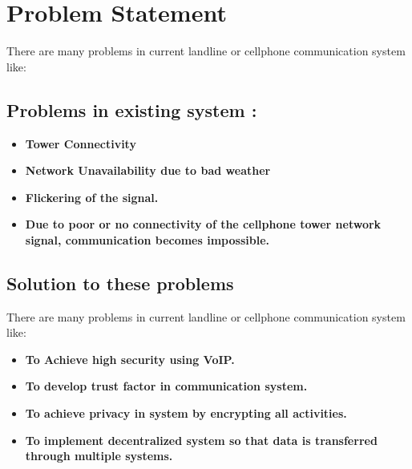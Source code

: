 \chapter{Problem Statement}
\justify
\quad 
There are many problems in current landline or cellphone communication system like:

\section{Problems in existing system : }
\begin{itemize}
    \item \textbf {Tower Connectivity}
\item \textbf {Network Unavailability due to bad weather}
\item \textbf {Flickering of the signal.}
\item \textbf {Due to poor or no connectivity of the cellphone tower network signal, communication becomes impossible.}
\end{itemize}

\section{Solution to these problems}
There are many problems in current landline or cellphone communication system like:
\begin{itemize}
    \item \textbf{To Achieve high security using VoIP.}
    \item \textbf{To develop trust factor in communication system.}
    \item \textbf{To achieve privacy in system by encrypting all activities.}
    \item \textbf{To implement decentralized system so that data is transferred through multiple systems.}
\end{itemize}

\newpage

